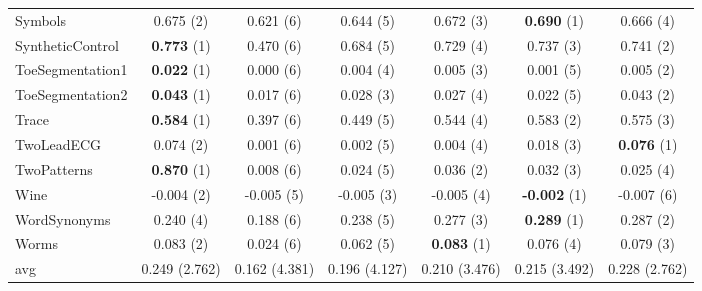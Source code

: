 \begin{table}[ht]
\begin{adjustbox}{width=\textwidth}
\begin{tabular}{lcccccc}
    Symbols & 0.675 (2) & 0.621 (6) & 0.644 (5) & 0.672 (3) & \textbf{0.690} (1) & 0.666 (4) \\
    SyntheticControl & \textbf{0.773} (1) & 0.470 (6) & 0.684 (5) & 0.729 (4) & 0.737 (3) & 0.741 (2) \\
    ToeSegmentation1 & \textbf{0.022} (1) & 0.000 (6) & 0.004 (4) & 0.005 (3) & 0.001 (5) & 0.005 (2) \\
    ToeSegmentation2 & \textbf{0.043} (1) & 0.017 (6) & 0.028 (3) & 0.027 (4) & 0.022 (5) & 0.043 (2) \\
    Trace & \textbf{0.584} (1) & 0.397 (6) & 0.449 (5) & 0.544 (4) & 0.583 (2) & 0.575 (3) \\
    TwoLeadECG & 0.074 (2) & 0.001 (6) & 0.002 (5) & 0.004 (4) & 0.018 (3) & \textbf{0.076} (1) \\
    TwoPatterns & \textbf{0.870} (1) & 0.008 (6) & 0.024 (5) & 0.036 (2) & 0.032 (3) & 0.025 (4) \\
    Wine & -0.004 (2) & -0.005 (5) & -0.005 (3) & -0.005 (4) & \textbf{-0.002} (1) & -0.007 (6) \\
    WordSynonyms & 0.240 (4) & 0.188 (6) & 0.238 (5) & 0.277 (3) & \textbf{0.289} (1) & 0.287 (2) \\
    Worms & 0.083 (2) & 0.024 (6) & 0.062 (5) & \textbf{0.083} (1) & 0.076 (4) & 0.079 (3) \\
    \hline 
    avg & 0.249 (2.762) & 0.162 (4.381) & 0.196 (4.127) & 0.210 (3.476) & 0.215 (3.492) & 0.228 (2.762) \\ 
    \hline
    \end{tabular}
    \end{adjustbox}
    \end{table}
    
